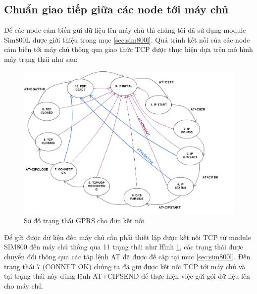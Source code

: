 \newpage







































\subsection{Chuẩn giao tiếp giữa các node tới máy chủ}
Để các node cảm biến gửi dữ liệu lên máy chủ thì chúng tôi đã sử dụng module Sim800L được giới thiệu trong mục \ref{sec:sim800l}. Quá trình kết nối của các node cảm biến tới máy chủ thông qua giao thức TCP được thực hiện dựa trên mô hình máy trạng thái như sau:


\begin{figure}[H]
\centering   
\includegraphics[width=1\textwidth]{sim800_status}
\caption[Sơ đồ trạng thái GPRS cho đơn kết nối]{Sơ đồ trạng thái GPRS cho đơn kết nối}
\label{fig:sim800_status}
\end{figure}

Để gửi được dữ liệu đến máy chủ cần phải thiết lập được kết nối TCP từ module SIM800 đến máy chủ thông qua 11 trạng thái như Hình \ref{fig:sim800_status}, các trạng thái được chuyển đổi thông qua các tập lệnh AT đã được đề cập tại mục \ref{sec:sim800l}. Đến trạng thái 7 (CONNET OK) chúng ta đã giữ được kết nối TCP tới máy chủ và tại trạng thái này dùng lệnh AT+CIPSEND để thực hiện việc gửi gói dữ liệu lên cho máy chủ.


